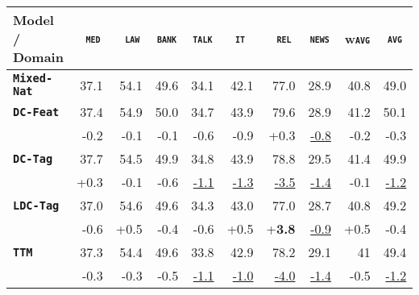 \documentclass[11pt,a4paper]{article}
\newcommand{\domain}[1]{\texttt{\textsc{#1}}}
\newcommand{\system}[1]{\texttt{\textbf{#1}}}
\newcommand{\SB}[1]{\textbf{#1}}
\newcommand{\SW}[1]{\underline{#1}}
\begin{document}
\begin{table*}
  \begin{tabular}{|p{2.5cm}|*{9}{r|}} \hline \footnotesize
    Model / Domain & \multicolumn{1}{c|}{\domain{ med}} & \multicolumn{1}{c|}{\domain{ law}} & \multicolumn{1}{c|}{\domain{bank}} & \multicolumn{1}{c|}{\domain{talk}} & \multicolumn{1}{c|}{\domain{ it }} & \multicolumn{1}{c|}{\domain{ rel}} & \multicolumn{1}{c|}{\domain{news}} & \multicolumn{1}{c|}{w\domain{avg}} & \multicolumn{1}{c|}{\domain{avg}} \\ \hline
     \system{Mixed-Nat}  & 37.1  & 54.1  & 49.6	& 34.1  & 42.1	& 77.0 & 28.9 & 40.8	& 49.0 \\ 
    \hline%
     \system{DC-Feat}     & 37.4 & 54.9   & 50.0    & 34.7  &  43.9  & 79.6 & 28.9  & 41.2 & 50.1\\[-2pt]
                   & \scriptsize -0.2 & \scriptsize -0.1  & \scriptsize -0.1 & \scriptsize -0.6 & \scriptsize -0.9 & \scriptsize +0.3 & \scriptsize \SW{-0.8} & \scriptsize -0.2 & \scriptsize -0.3\\

    \system{DC-Tag}      &  37.7 & 54.5   & 49.9    &  34.8 &  43.9  & 78.8 & 29.5  & 41.4 & 49.9\\[-2pt]
                   & \scriptsize +0.3  & \scriptsize -0.1   & \scriptsize -0.6    & \scriptsize \SW{-1.1}  &  \scriptsize \SW{-1.3}  & \scriptsize \SW{-3.5}  & \scriptsize \SW{-1.4}  & \scriptsize -0.1 & \scriptsize \SW{-1.2}\\
    
    \system{LDC-Tag}    & 37.0   & 54.6  & 49.6    & 34.3  &  43.0  &77.0  & 28.7 & 40.8 & 49.2 \\[-2pt]
                    & \scriptsize -0.6 &	\scriptsize +0.5 & \scriptsize -0.4 & \scriptsize -0.6 &	\scriptsize +0.5 & \scriptsize +\SB{3.8} & \scriptsize \SW{-0.9} & \scriptsize +0.5 & \scriptsize -0.4 \\

    \system{TTM}           &  37.3 & 54.4   & 49.6    & 33.8  &  42.9  &78.2  & 29.1 & 41 & 49.4\\[-2pt]
                    & \scriptsize -0.3  & \scriptsize -0.3  & \scriptsize -0.5    & \scriptsize \SW{-1.1}  &  \scriptsize \SW{-1.0}  & \scriptsize \SW{-4.0}  & \scriptsize \SW{-1.4}& \scriptsize -0.5 & \scriptsize \SW{-1.2}\\
    

\end{tabular}
\end{table*}
\end{document}
